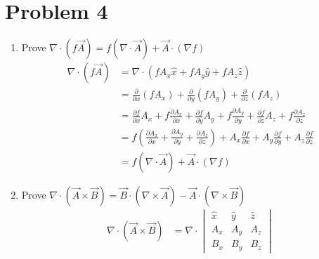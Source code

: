 \documentclass[12pt]{article}
\begin{document}
\section*{Problem 4}
\begin{enumerate}
	\item Prove \(\nabla \cdot (f\vec{A}) = f(\nabla \cdot \vec{A}) + \vec{A} \cdot (\nabla f) \)
	      \begin{align*}
		      \nabla \cdot (f\vec{A}) & = \nabla \cdot (fA_x \hat{x} + fA_y \hat{y} + fA_z \hat{z})                                                                                                                                                                      \\
		                              & = \frac{\partial}{\partial x} (fA_x) + \frac{\partial}{\partial y} (fA_y) + \frac{\partial}{\partial z} (fA_z)                                                                                                                   \\
		                              & = \frac{\partial f}{\partial x} A_x + f \frac{\partial A_x}{\partial x} + \frac{\partial f}{\partial y} A_y + f \frac{\partial A_y}{\partial y} + \frac{\partial f}{\partial z} A_z + f \frac{\partial A_z}{\partial z}          \\
		                              & = f \left(\frac{\partial A_x}{\partial x} + \frac{\partial A_y}{\partial y} + \frac{\partial A_z}{\partial z}\right) + A_x \frac{\partial f}{\partial x} + A_y \frac{\partial f}{\partial y} + A_z \frac{\partial f}{\partial z} \\
		                              & = f(\nabla \cdot \vec{A}) + \vec{A} \cdot (\nabla f)
	      \end{align*}
	\item Prove \(\nabla \cdot (\vec{A} \times \vec{B}) = \vec{B} \cdot (\nabla \times \vec{A}) - \vec{A} \cdot (\nabla \times \vec{B})\)
	      \begin{align*}
		      \nabla \cdot (\vec{A} \times \vec{B}) & = \nabla \cdot
		      \begin{vmatrix}
			      \hat{x} & \hat{y} & \hat{z} \\
			      A_x     & A_y     & A_z     \\
			      B_x     & B_y     & B_z
		      \end{vmatrix}                                                                                                                                                                                                                                                                                                                                                \\

\end{align*}
\end{enumerate}
\end{document}
